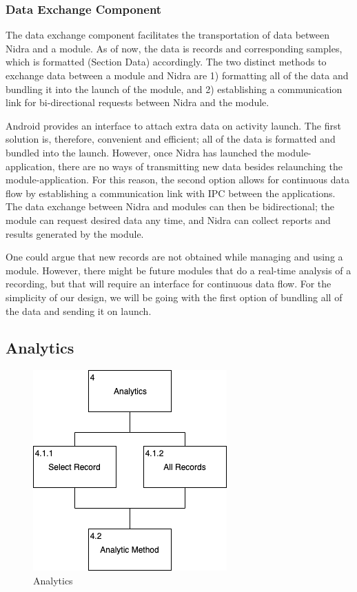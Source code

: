 \subsubsection{Data Exchange Component}

The data exchange component facilitates the transportation of data between Nidra and a module. As of now, the data is records and corresponding samples, which is formatted (Section Data) accordingly. The two distinct methods to exchange data between a module and Nidra are 1) formatting all of the data and bundling it into the launch of the module, and 2) establishing a communication link for bi-directional requests between Nidra and the module. 

Android provides an interface to attach extra data on activity launch. The first solution is, therefore, convenient and efficient; all of the data is formatted and bundled into the launch. However, once Nidra has launched the module-application, there are no ways of transmitting new data besides relaunching the module-application. For this reason, the second option allows for continuous data flow by establishing a communication link with IPC between the applications. The data exchange between Nidra and modules can then be bidirectional; the module can request desired data any time, and Nidra can collect reports and results generated by the module. 

One could argue that new records are not obtained while managing and using a module. However, there might be future modules that do a real-time analysis of a recording, but that will require an interface for continuous data flow. For the simplicity of our design, we will be going with the first option of bundling all of the data and sending it on launch.

\subsection{Analytics}\label{soc:analytics}

\begin{figure}
    \centering
    \includegraphics[scale=0.6]{images/Analytics.png}
    \caption{Analytics}
    \label{fig:hta_analytics}
\end{figure}

